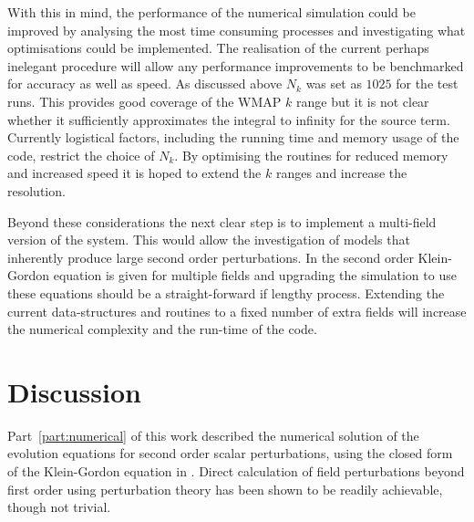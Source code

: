 With this in mind, the performance of the numerical simulation could be improved by
analysing the most time consuming processes and investigating what
optimisations could be implemented. The realisation of the current perhaps inelegant
procedure will allow any performance improvements to be benchmarked for accuracy as
well as speed.
% 
As discussed above $N_k$ was set as $1025$ for the test runs. This provides good
coverage of the
WMAP $k$ range but it is not clear whether it sufficiently
approximates the integral to infinity for the source term.  Currently
logistical factors, including the running time and memory usage of the code,
restrict the choice of $N_k$. By optimising the routines
for reduced memory and increased speed it is hoped to extend the $k$ ranges and
increase the resolution. 


Beyond these considerations the next clear step is to implement a multi-field
version of the system. This would allow the investigation of models that inherently
produce large second order perturbations. In  the
second order Klein-Gordon equation is given for multiple fields and upgrading the
simulation to use these equations should be a straight-forward if lengthy process.
Extending the current data-structures and routines to a fixed number of extra fields
will increase the numerical complexity and the run-time of the code. 



% 
% 
% 
\section{Discussion}
\label{sec:disc-num}

Part~\ref{part:numerical} of this work described the numerical
solution of the evolution equations for second order scalar perturbations, using the
closed form of the Klein-Gordon equation in . Direct
calculation of field perturbations beyond
first order using perturbation theory has been shown to be readily achievable, though
not trivial.

